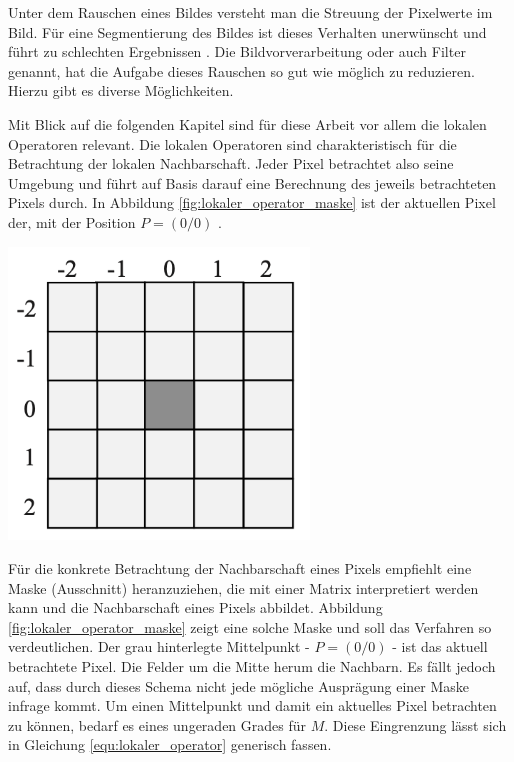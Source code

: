 Unter dem Rauschen eines Bildes versteht man die Streuung der Pixelwerte im Bild.
Für eine Segmentierung des Bildes ist dieses Verhalten unerwünscht und führt zu
schlechten Ergebnissen \citep[vgl.][S.~51]{handels2000}. Die Bildvorverarbeitung
oder auch Filter genannt, hat die Aufgabe dieses Rauschen so gut wie möglich zu reduzieren.
Hierzu gibt es diverse Möglichkeiten.

\begin{minipage}{0.40\textwidth}
	Mit Blick auf die folgenden Kapitel sind für diese Arbeit vor allem die lokalen
	Operatoren relevant. Die lokalen Operatoren sind charakteristisch für die
	Betrachtung der lokalen Nachbarschaft. Jeder Pixel betrachtet also seine Umgebung
	und führt auf Basis darauf eine Berechnung des jeweils betrachteten Pixels durch.
	In Abbildung \ref{fig:lokaler_operator_maske} ist der aktuellen Pixel der, mit
	der Position $P = (0/0)$ \citep[vgl.][S.~52]{handels2000}.
\end{minipage}
\hfill
\begin{minipage}{0.50\textwidth}
	\centering
	\includegraphics[width=0.60\textwidth]{img/lokaler_operator_maske.jpg}
	\label{fig:lokaler_operator_maske}
\end{minipage}

Für die konkrete Betrachtung der Nachbarschaft eines Pixels empfiehlt \citet[S.~52]{handels2000}
eine Maske (Ausschnitt) heranzuziehen, die mit einer Matrix interpretiert werden
kann und die Nachbarschaft eines Pixels abbildet. Abbildung
\ref{fig:lokaler_operator_maske} zeigt eine solche Maske und soll das Verfahren
so verdeutlichen. Der grau hinterlegte Mittelpunkt - $P = (0/0)$ - ist das aktuell
betrachtete Pixel. Die Felder um die Mitte herum die Nachbarn. Es fällt jedoch auf,
dass durch dieses Schema nicht jede mögliche Ausprägung einer Maske infrage
kommt. Um einen Mittelpunkt und damit ein aktuelles Pixel betrachten zu können,
bedarf es eines ungeraden Grades für $M$. Diese Eingrenzung lässt sich in Gleichung
\ref{equ:lokaler_operator} generisch fassen.

